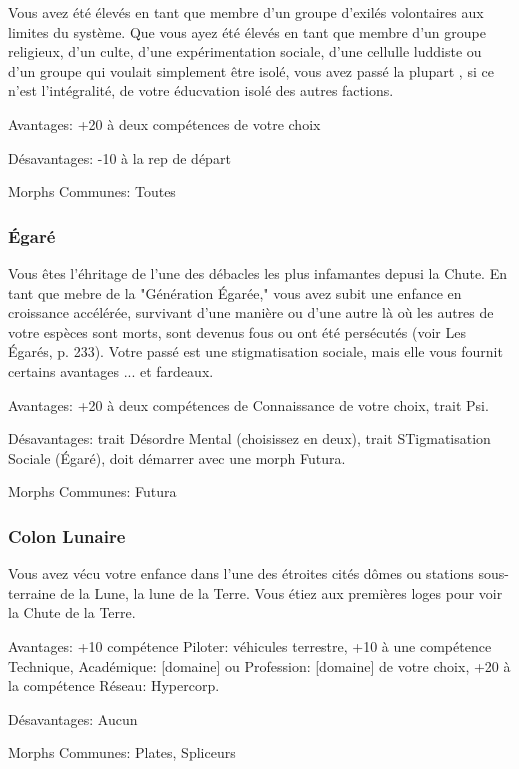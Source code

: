 Vous avez été élevés en tant que membre d'un groupe d'exilés volontaires aux limites du système. Que vous ayez été élevés en tant que membre d'un groupe religieux, d'un culte, d'une expérimentation sociale, d'une cellulle luddiste ou d'un groupe qui voulait simplement être isolé, vous avez passé la plupart , si ce n'est l'intégralité, de votre éducvation isolé des autres factions. 

Avantages: +20 à deux compétences de votre choix 

Désavantages: -10 à la rep de départ 

Morphs Communes: Toutes 

\subsubsection{Égaré} \label{sec:lost} 

Vous êtes l'éhritage de l'une des débacles les plus infamantes depusi la Chute. En tant que mebre de la "Génération Égarée," vous avez subit une enfance en croissance accélérée, survivant d'une manière ou d'une autre là où les autres de votre espèces sont morts, sont devenus fous ou ont été persécutés (voir Les Égarés, p. 233). Votre passé est une stigmatisation sociale, mais elle vous fournit certains avantages ... et fardeaux. 

Avantages: +20 à deux compétences de Connaissance de votre choix, trait Psi. 

Désavantages: trait Désordre Mental (choisissez en deux), trait STigmatisation Sociale (Égaré), doit démarrer avec une morph Futura. 

Morphs Communes: Futura 

\subsubsection{Colon Lunaire} \label{sec:lunar-colonist} 

Vous avez vécu votre enfance dans l'une des étroites cités dômes ou stations sous-terraine de la Lune, la lune de la Terre. Vous étiez aux premières loges pour voir la Chute de la Terre. 

Avantages: +10 compétence Piloter: véhicules terrestre, +10 à une compétence Technique, Académique: [domaine] ou Profession: [domaine] de votre choix, +20 à la compétence Réseau: Hypercorp. 

Désavantages: Aucun 

Morphs Communes: Plates, Spliceurs 





